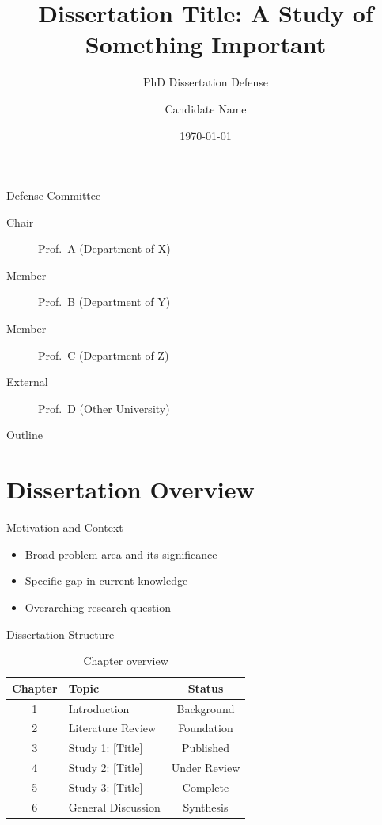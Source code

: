 \documentclass[aspectratio=169,11pt]{beamer}
\title[Defense]{Dissertation Title: A Study of Something Important}
\subtitle{PhD Dissertation Defense}
\author[Candidate]{Candidate Name}
\institute{Department of X \\ University of Y}
\date{\today}
\begin{document}
\begin{frame}
  \titlepage
\end{frame}


\begin{frame}{Defense Committee}
  \begin{description}
    \item[Chair] Prof.\ A (Department of X)
    \item[Member] Prof.\ B (Department of Y)
    \item[Member] Prof.\ C (Department of Z)
    \item[External] Prof.\ D (Other University)
  \end{description}
\end{frame}

\begin{frame}{Outline}
  \tableofcontents
\end{frame}

\section{Dissertation Overview}

\begin{frame}{Motivation and Context}
  \begin{itemize}
    \item Broad problem area and its significance
    \item Specific gap in current knowledge
    \item Overarching research question
  \end{itemize}
\end{frame}

\begin{frame}{Dissertation Structure}
  \begin{table}
    \caption{Chapter overview}
    \begin{tabular}{clc}
      \toprule
      Chapter & Topic & Status \\
      \midrule
      1 & Introduction & Background \\
      2 & Literature Review & Foundation \\
      3 & Study 1: [Title] & Published \\
      4 & Study 2: [Title] & Under Review \\
      5 & Study 3: [Title] & Complete \\
      6 & General Discussion & Synthesis \\
      \bottomrule
    \end{tabular}
  \end{table}
\end{frame}
\end{document}
